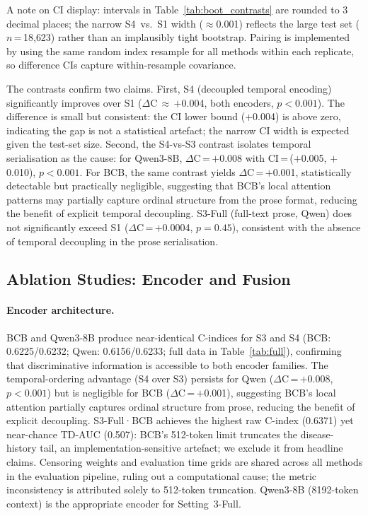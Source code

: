 A note on CI display: intervals in Table~\ref{tab:boot_contrasts} are rounded
to 3 decimal places; the narrow S4~vs.~S1 width ($\approx$0.001) reflects the
large test set ($n$\,=\,18{,}623) rather than an implausibly tight bootstrap.
Pairing is implemented by using the same random index resample for all methods
within each replicate, so difference CIs capture within-resample covariance.

The contrasts confirm two claims.
First, S4 (decoupled temporal encoding) significantly improves over S1
($\Delta$C\,$\approx$\,$+$0.004, both encoders, $p<0.001$).
The difference is small but consistent: the CI lower bound ($+$0.004) is
above zero, indicating the gap is not a statistical artefact; the narrow
CI width is expected given the test-set size.
Second, the S4-vs-S3 contrast isolates temporal serialisation as the cause:
for Qwen3-8B, $\Delta$C\,=\,$+$0.008 with CI\,=\,($+$0.005, $+$0.010),
$p<0.001$.
For BCB, the same contrast yields $\Delta$C\,=\,$+$0.001, statistically
detectable but practically negligible, suggesting that BCB's local
attention patterns may partially capture ordinal structure from the prose
format, reducing the benefit of explicit temporal decoupling.
S3-Full (full-text prose, Qwen) does not significantly exceed S1
($\Delta$C\,=\,$+$0.0004, $p=0.45$), consistent with the absence of
temporal decoupling in the prose serialisation.

\subsection{Ablation Studies: Encoder and Fusion}
\label{sec:encoder}

\paragraph{Encoder architecture.}
BCB and Qwen3-8B produce near-identical C-indices for S3 and S4
(BCB: 0.6225/0.6232; Qwen: 0.6156/0.6233; full data in Table~\ref{tab:full}),
confirming that discriminative information is accessible to both encoder
families.
The temporal-ordering advantage (S4 over S3) persists for Qwen
($\Delta$C\,=\,$+$0.008, $p<0.001$) but is negligible for BCB
($\Delta$C\,=\,$+$0.001), suggesting BCB's local attention partially
captures ordinal structure from prose, reducing the benefit of explicit
decoupling.
S3-Full·BCB achieves the highest raw C-index (0.6371) yet near-chance TD-AUC
(0.507): BCB's 512-token limit truncates the disease-history tail, an
implementation-sensitive artefact; we exclude it from headline claims.
Censoring weights and evaluation time grids are shared across all methods
in the evaluation pipeline, ruling out a computational cause; the metric
inconsistency is attributed solely to 512-token truncation.
Qwen3-8B (8192-token context) is the appropriate encoder for Setting~3-Full.

